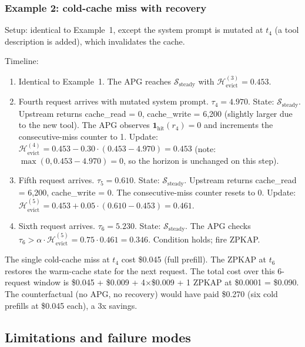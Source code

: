 \subsubsection{Example 2: cold-cache miss with recovery}

Setup: identical to Example~1, except the system prompt is
mutated at $t_4$ (a tool description is added), which invalidates
the cache.

\noindent
Timeline:
\begin{enumerate}
  \item[$t_1, t_2, t_3$] Identical to Example~1. The APG
        reaches $\mathcal{S}_{\text{steady}}$ with
        $\mathcal{H}_{\text{evict}}^{(3)} = 0.453$.
  \item[$t_4 = 14.280$] Fourth request arrives with mutated
        system prompt. $\tau_4 = 4.970$. State:
        $\mathcal{S}_{\text{steady}}$. Upstream returns
        cache\_read = 0, cache\_write = 6{,}200 (slightly
        larger due to the new tool). The APG observes
        $\mathbf{1}_{\text{hit}}(r_4) = 0$ and increments
        the consecutive-miss counter to 1.
        Update: $\mathcal{H}_{\text{evict}}^{(4)} = 0.453
        - 0.30 \cdot (0.453 - 4.970) = 0.453$ (note:
        $\max(0, 0.453 - 4.970) = 0$, so the horizon is
        unchanged on this step).
  \item[$t_5 = 14.890$] Fifth request arrives.
        $\tau_5 = 0.610$. State: $\mathcal{S}_{\text{steady}}$.
        Upstream returns cache\_read = 6{,}200, cache\_write = 0.
        The consecutive-miss counter resets to 0. Update:
        $\mathcal{H}_{\text{evict}}^{(5)} = 0.453
        + 0.05 \cdot (0.610 - 0.453) = 0.461$.
  \item[$t_6 = 20.120$] Sixth request arrives.
        $\tau_6 = 5.230$. State: $\mathcal{S}_{\text{steady}}$.
        The APG checks $\tau_6 > \alpha \cdot
        \mathcal{H}_{\text{evict}}^{(5)} = 0.75 \cdot 0.461
        = 0.346$. Condition holds; fire ZPKAP.
\end{enumerate}

\noindent
The single cold-cache miss at $t_4$ cost \$0.045 (full
prefill). The ZPKAP at $t_6$ restores the warm-cache state
for the next request. The total cost over this 6-request
window is \$0.045 + \$0.009 + 4$\times$\$0.009 + 1 ZPKAP at
\$0.0001 = \$0.090. The counterfactual (no APG, no recovery)
would have paid \$0.270 (six cold prefills at \$0.045 each),
a 3x savings.

\subsection{Limitations and failure modes}
\label{app:apg:limitations}

